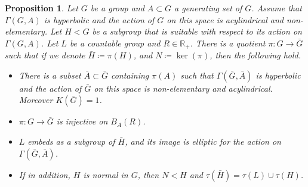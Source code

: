 \documentclass[11pt]{article}
\newtheorem{proposition}[theorem]{Proposition}
\theoremstyle{definition}
\begin{document}
\begin{proposition}
\label{res: quotient with prescribed torsion}
Let $G$ be a group and $A \subset G$ a generating set of $G$.
Assume that $\Gamma(G,A)$ is hyperbolic and the action of $G$ on this space is acylindrical and non-elementary.
Let $H < G$ be a subgroup that is suitable with respect to its action on $\Gamma(G,A)$.
Let $L$ be a countable group and $R \in \mathbb R_+$.
There is a quotient $\pi : G \to \bar G$ such that if we denote $\bar H \coloneqq \pi(H)$, and $N \coloneqq \ker(\pi)$, then the following hold.
\begin{itemize}
\item There is a subset $\bar A \subset \bar G$ containing $\pi(A)$ such that $\Gamma(\bar G, \bar A)$ is hyperbolic and the action of $\bar G$ on this space is non-elementary and acylindrical. Moreover $K(\bar G) = 1$.
\item $\pi : G \to \bar G$ is injective on $B_A(R)$.
\item $L$ embeds as a subgroup of $\bar H$, and its image is elliptic for the action on $\Gamma(\bar G, \bar A)$.
\item If in addition, $H$ is normal in $G$, then $N < H$ and $\tau(\bar H) = \tau(L) \cup \tau(H)$.
\end{itemize} 
\end{proposition}
\end{document}
